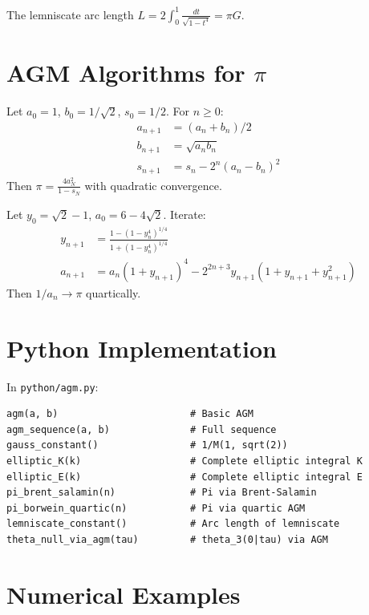 The lemniscate arc length $L = 2 \int_0^1 \frac{dt}{\sqrt{1-t^4}} = \pi G$.

\section{AGM Algorithms for $\pi$}

\begin{theorem}
Let $a_0 = 1$, $b_0 = 1/\sqrt{2}$, $s_0 = 1/2$. For $n \ge 0$:
\begin{align*}
a_{n+1} &= (a_n + b_n)/2 \\
b_{n+1} &= \sqrt{a_n b_n} \\
s_{n+1} &= s_n - 2^n (a_n - b_n)^2
\end{align*}
Then $\pi = \frac{4 a_N^2}{1 - s_N}$ with quadratic convergence.
\end{theorem}

\begin{theorem}
Let $y_0 = \sqrt{2} - 1$, $a_0 = 6 - 4\sqrt{2}$. Iterate:
\begin{align*}
y_{n+1} &= \frac{1 - (1-y_n^4)^{1/4}}{1 + (1-y_n^4)^{1/4}} \\
a_{n+1} &= a_n (1+y_{n+1})^4 - 2^{2n+3} y_{n+1} (1+y_{n+1}+y_{n+1}^2)
\end{align*}
Then $1/a_n \to \pi$ quartically.
\end{theorem}

\section{Python Implementation}

In \texttt{python/agm.py}:

\begin{lstlisting}[style=python, caption={Key functions in python/agm.py}]
agm(a, b)                       # Basic AGM
agm_sequence(a, b)              # Full sequence
gauss_constant()                # 1/M(1, sqrt(2))
elliptic_K(k)                   # Complete elliptic integral K
elliptic_E(k)                   # Complete elliptic integral E
pi_brent_salamin(n)             # Pi via Brent-Salamin
pi_borwein_quartic(n)           # Pi via quartic AGM
lemniscate_constant()           # Arc length of lemniscate
theta_null_via_agm(tau)         # theta_3(0|tau) via AGM
\end{lstlisting}

\section{Numerical Examples}

